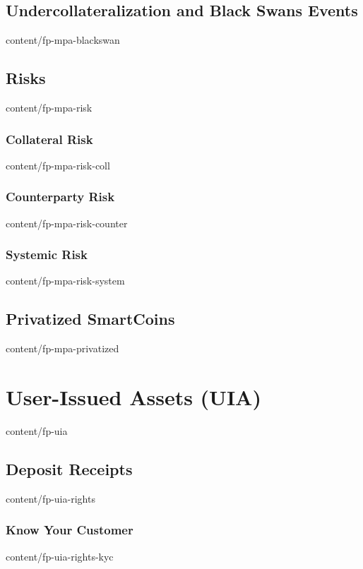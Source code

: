 \documentclass[conference,final,10pt,a4paper]{IEEEtran}
\begin{document}
\subsection     { Undercollateralization and Black Swans Events    }  { content/fp-mpa-blackswan       } 
\subsection     { Risks                                            }  { content/fp-mpa-risk            } 
\subsubsection  { Collateral Risk                                  }  { content/fp-mpa-risk-coll       } 
\subsubsection  { Counterparty Risk                                }  { content/fp-mpa-risk-counter    } 
\subsubsection  { Systemic Risk                                    }  { content/fp-mpa-risk-system     } 
\subsection     { Privatized SmartCoins                            }  { content/fp-mpa-privatized      } 

\section        { User-Issued Assets (UIA)                         }  { content/fp-uia                 } 
\subsection     { Deposit Receipts                                 }  { content/fp-uia-rights          } 
\subsubsection  { Know Your Customer                               }  { content/fp-uia-rights-kyc      } 
\end{document}
